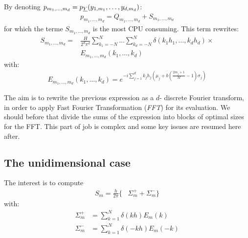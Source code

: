 By denoting $p_{m_1,\hdots,m_d}=p_{{\underline{Y}}}(y_{1,m_1},\hdots,y_{d,m_d})$:
\begin{align}
  p_{m_1,\hdots,m_d}= Q_{m_1,\hdots,m_d}+S_{m_1,\hdots,m_d}
\end{align}
for which the terme $S_{m_1,\hdots,m_d}$ is the most CPU consuming. This term rewrites:
\begin{align}
S_{m_1,\hdots,m_d}=&\frac{H}{2^d\pi^d}\sum_{k_1=-N}^{N}\hdots\sum_{k_d=-N}^{N}\delta\left(k_1h_1,\hdots,k_dh_d\right)\times\nonumber\\
&E_{m_1,\hdots,m_d}(k_1,\hdots,k_d)
\end{align}
with:
\begin{align}
  E_{m_1,\hdots,m_d}(k_1,\hdots,k_d)=e^{-i\sum_{j=1}^d k_jh_j\left(\mu_j+b\left(\frac{2m_j+1}{M}-1\right)\sigma_j\right)}
\end{align}

The aim is to rewrite the previous expression as a $d$- discrete Fourier transform, in order to apply Fast Fourier Transformation (\emph{FFT}) for its evaluation.
We should before that divide the sums of the expression into blocks of optimal sizes for the FFT. This part of job is complex and some key issues are resumed here after.

\subsection{The unidimensional case}

The interest is to compute
\begin{align}
S_{m}=\frac{h}{2\pi}\Big\{&\Sigma_{m}^{+} + \Sigma_{m}^{-} \Big\}
\end{align}
with:
\begin{align}
\Sigma_{m}^{+}&=\sum_{k=1}^{N}\delta( kh)E_{m}(k)\\
\Sigma_{m}^{-}&=\sum_{k=1}^{N}\delta(-kh)E_{m}(-k)\\
\end{align}


